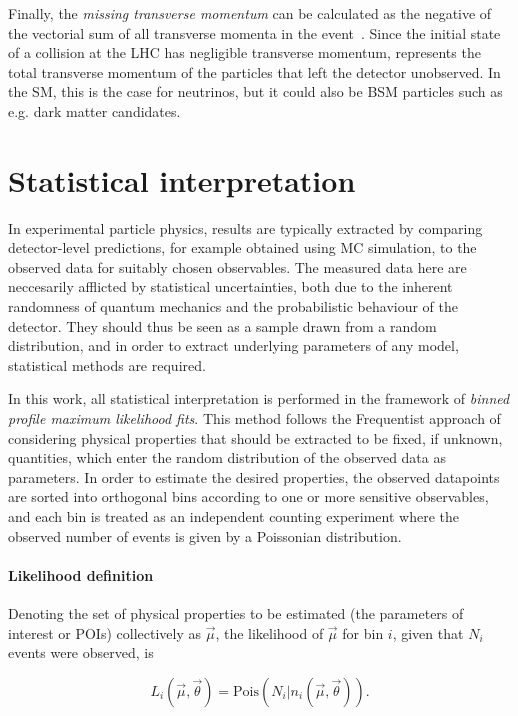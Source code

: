 Finally, the \textit{missing transverse momentum} \ptmissvec can be calculated as the negative of the vectorial sum of all transverse momenta in the event~\cite{CMS:JME-17-001}. Since the initial state of a collision at the LHC has negligible transverse momentum, \ptmissvec represents the total transverse momentum of the particles that left the detector unobserved. In the SM, this is the case for neutrinos, but it could also be BSM particles such as e.g. dark matter candidates.

\section{Statistical interpretation}
\label{sec:methods:stat}

In experimental particle physics, results are typically extracted by comparing detector-level predictions, for example obtained using MC simulation, to the observed data for suitably chosen observables. The measured data here are neccesarily afflicted by statistical uncertainties, both due to the inherent randomness of quantum mechanics and the probabilistic behaviour of the detector. They should thus be seen as a sample drawn from a random distribution, and in order to extract underlying parameters of any model, statistical methods are required.

In this work, all statistical interpretation is performed in the framework of \textit{binned profile maximum likelihood fits}. This method follows the Frequentist approach of considering physical properties that should be extracted to be fixed, if unknown, quantities, which enter the random distribution of the observed data as parameters. In order to estimate the desired properties, the observed datapoints are sorted into orthogonal bins according to one or more sensitive observables, and each bin is treated as an independent counting experiment where the observed number of events is given by a Poissonian distribution. 

\paragraph{Likelihood definition}
Denoting the set of physical properties to be estimated (the parameters of interest or POIs) collectively as $\vec{\mu}$, the likelihood of $\vec{\mu}$ for bin $i$, given that $N_i$ events were observed, is~\cite{Cowan:2010js}

\begin{equation}
    L_i (\vec{\mu}, \vec{\theta}) = \mathrm{Pois} \left(N_i | n_i (\vec{\mu}, \vec{\theta}) \right).
\end{equation}

